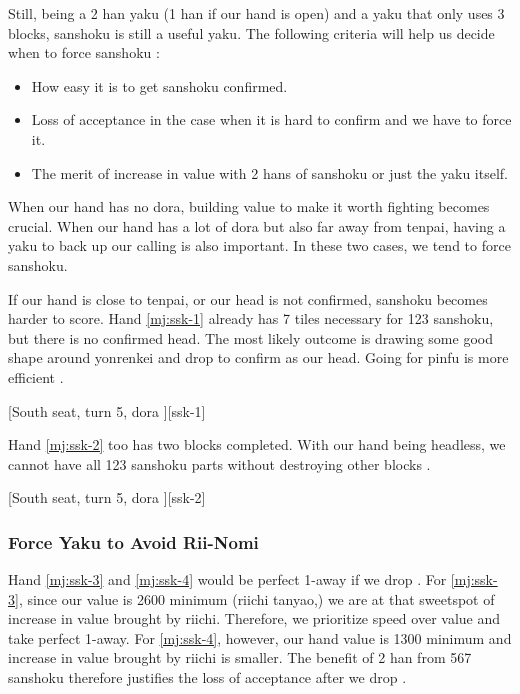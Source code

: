 \documentclass[12pt]{article}
\begin{document}
Still, being a 2 han yaku (1 han if our hand is open) and a yaku that only uses 3 blocks, sanshoku is still a useful yaku. The following criteria will help us decide when to force sanshoku \citep{gendai-ssk}:

\begin{itemize}
\item How easy it is to get sanshoku confirmed.
\item Loss of acceptance in the case when it is hard to confirm and we have to force it.
\item The merit of increase in value with 2 hans of sanshoku or just the yaku itself.
\end{itemize}

When our hand has no dora, building value to make it worth fighting becomes crucial. When our hand has a lot of dora but also far away from tenpai, having a yaku to back up our calling is also important. In these two cases, we tend to force sanshoku.

If our hand is close to tenpai, or our head is not confirmed, sanshoku becomes harder to score. Hand \ref{mj:ssk-1} already has 7 tiles necessary for 123 sanshoku, but there is no confirmed head. The most likely outcome is drawing some good shape around  yonrenkei and drop  to confirm  as our head. Going for pinfu is more efficient \citep[][p.~67]{zero-teyaku}.

[South seat, turn 5, dora ][ssk-1]

Hand \ref{mj:ssk-2} too has two blocks completed. With our hand being headless, we cannot have all 123 sanshoku parts without destroying other blocks \citep[][p.~67]{zero-teyaku}.

[South seat, turn 5, dora ][ssk-2]


\subsubsection*{Force Yaku to Avoid Rii-Nomi}

Hand \ref{mj:ssk-3} and \ref{mj:ssk-4} would be perfect 1-away if we drop . For \ref{mj:ssk-3}, since our value is 2600 minimum (riichi tanyao,) we are at that sweetspot of increase in value brought by riichi. Therefore, we prioritize speed over value and take perfect 1-away. For \ref{mj:ssk-4}, however, our hand value is 1300 minimum and increase in value brought by riichi is smaller. The benefit of 2 han from 567 sanshoku therefore justifies the loss of  acceptance after we drop  \citep{clearrain-ssk}.
\end{document}
